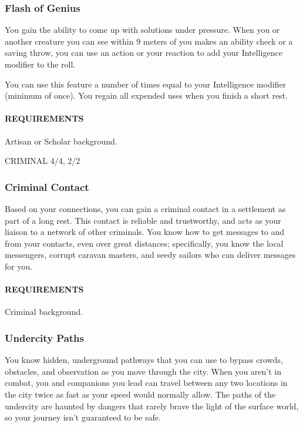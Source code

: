    \subsubsection{Flash of Genius} \label{feat::flashofgenius}
        You gain the ability to come up with solutions under pressure.
        When you or another creature you can see within 9 meters of you makes an ability check or a saving throw, you can use an action or your reaction to add your Intelligence modifier to the roll.

        You can use this feature a number of times equal to your Intelligence modifier (minimum of once).
        You regain all expended uses when you finish a short rest.
        \paragraph{REQUIREMENTS} Artisan or Scholar background.

CRIMINAL 4/4, 2/2
    \subsubsection{Criminal Contact} \label{feat::criminalcontact}
        Based on your connections, you can gain a criminal contact in a settlement as part of a long rest.
        This contact is reliable and trustworthy, and acts as your liaison to a network of other criminals.
        You know how to get messages to and from your contacts, even over great distances; specifically, you know the local messengers, corrupt caravan masters, and seedy sailors who can deliver messages for you.
        \paragraph{REQUIREMENTS} Criminal background.

    \subsubsection{Undercity Paths} \label{feat::undercitypaths}
        You know hidden, underground pathways that you can use to bypass crowds, obstacles, and observation as you move through the city.
        When you aren't in combat, you and companions you lead can travel between any two locations in the city twice as fast as your speed would normally allow.
        The paths of the undercity are haunted by dangers that rarely brave the light of the surface world, so your journey isn't guaranteed to be safe.
